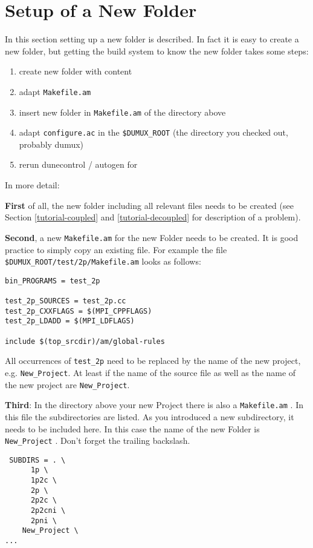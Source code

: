 \section{Setup of a New Folder}

In this section setting up a new folder is described. In fact it is easy to create a new folder, but getting the build system to know the new folder takes some steps:

\begin{enumerate}[1)]
 \item create new folder with content
 \item adapt \verb+Makefile.am+
 \item insert new folder in \verb+Makefile.am+ of the directory above
 \item adapt \verb+configure.ac+ in the \verb+$DUMUX_ROOT+ (the directory you checked out, probably dumux)
 \item rerun dunecontrol / autogen for \Dumux
\end{enumerate}

\noindent In more detail:

\textbf{First} of all, the new folder including all relevant files needs to be created (see Section \ref{tutorial-coupled} and \ref{tutorial-decoupled} for description of a problem). 

\textbf{Second}, a new \verb+Makefile.am+ for the new Folder needs to be created. It is good practice to simply copy an existing file. For example the file \verb+$DUMUX_ROOT/test/2p/Makefile.am+ looks as follows:
\begin{verbatim}
bin_PROGRAMS = test_2p

test_2p_SOURCES = test_2p.cc
test_2p_CXXFLAGS = $(MPI_CPPFLAGS) 
test_2p_LDADD = $(MPI_LDFLAGS) 

include $(top_srcdir)/am/global-rules
\end{verbatim}

All occurrences of \verb+test_2p+ need to be replaced by the name of the new project, e.g. \verb+New_Project+. At least if the name of the source file as well as the name of the new project are \verb+New_Project+.

\textbf{Third}: In the directory above your new Project there is also a \verb+Makefile.am+ . In this file the subdirectories are listed. As you introduced a new subdirectory, it needs to be included here. In this case the name of the new Folder is \verb+New_Project+ . Don't forget the trailing backslash.

\begin{verbatim}
 SUBDIRS = . \
	  1p \
	  1p2c \
	  2p \
	  2p2c \
	  2p2cni \
	  2pni \
	New_Project \
...
\end{verbatim}

